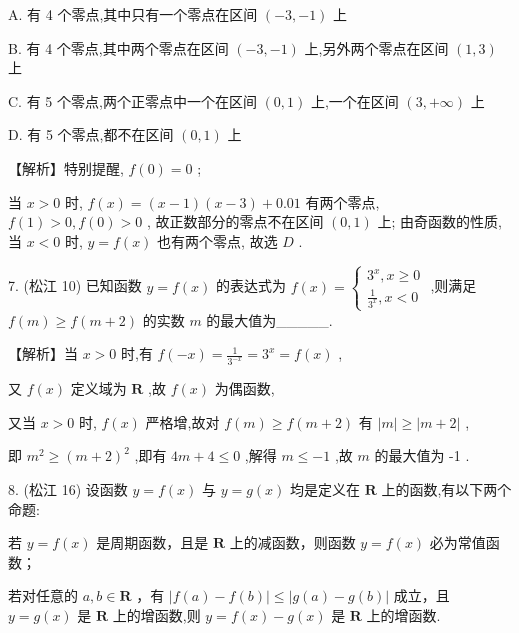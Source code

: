 \documentclass[10pt]{article}
\newcommand*\circled[1]{\tikz[baseline=(char.base)]{\node[shape=circle,draw,inner sep=1.5pt] (char) {\small #1};}}
\begin{document}
A. 有 4 个零点,其中只有一个零点在区间 \(\left( {-3, - 1}\right)\) 上

B. 有 4 个零点,其中两个零点在区间 \(\left( {-3, - 1}\right)\) 上,另外两个零点在区间 \(\left( {1,3}\right)\) 上

C. 有 5 个零点,两个正零点中一个在区间 \(\left( {0,1}\right)\) 上,一个在区间 \(\left( {3, + \infty }\right)\) 上

D. 有 5 个零点,都不在区间 \(\left( {0,1}\right)\) 上

【解析】特别提醒, \(f\left( 0\right)  = 0\) ;

当 \(x > 0\) 时, \(f\left( x\right)  = \left( {x - 1}\right) \left( {x - 3}\right)  + {0.01}\) 有两个零点, \(f\left( 1\right)  > 0,f\left( 0\right)  > 0\) , 故正数部分的零点不在区间 \(\left( {0,1}\right)\) 上; 由奇函数的性质,当 \(x < 0\) 时, \(y = f\left( x\right)\) 也有两个零点, 故选 \(D\) .

7. (松江 10) 已知函数 \(y = f\left( x\right)\) 的表达式为 \(f\left( x\right)  = \left\{  \begin{array}{l} {3}^{x},x \geq  0 \\  \frac{1}{{3}^{x}},x < 0 \end{array}\right.\) ,则满足 \(f\left( m\right)  \geq  f\left( {m + 2}\right)\) 的实数 \(m\) 的最大值为\_\_\_\_\_.

【解析】当 \(x > 0\) 时,有 \(f\left( {-x}\right)  = \frac{1}{{3}^{-x}} = {3}^{x} = f\left( x\right)\) ,

又 \(f\left( x\right)\) 定义域为 \(\mathbf{R}\) ,故 \(f\left( x\right)\) 为偶函数,

又当 \(x > 0\) 时, \(f\left( x\right)\) 严格增,故对 \(f\left( m\right)  \geq  f\left( {m + 2}\right)\) 有 \(\left| m\right|  \geq  \left| {m + 2}\right|\) ,

即 \({m}^{2} \geq  {\left( m + 2\right) }^{2}\) ,即有 \({4m} + 4 \leq  0\) ,解得 \(m \leq   - 1\) ,故 \(m\) 的最大值为 -1 .

8. (松江 16) 设函数 \(y = f\left( x\right)\) 与 \(y = g\left( x\right)\) 均是定义在 \(\mathbf{R}\) 上的函数,有以下两个命题:

 \circled{1} 若 \(y = f\left( x\right)\) 是周期函数，且是 \(\mathbf{R}\) 上的减函数，则函数 \(y = f\left( x\right)\) 必为常值函数；

 \circled{2} 若对任意的 \(a,b \in  \mathbf{R}\) ，有 \(\left| {f\left( a\right)  - f\left( b\right) }\right|  \leq  \left| {g\left( a\right)  - g\left( b\right) }\right|\) 成立，且 \(y = g\left( x\right)\) 是 \(\mathbf{R}\) 上的增函数,则 \(y = f\left( x\right)  - g\left( x\right)\) 是 \(\mathbf{R}\) 上的增函数.
\end{document}
